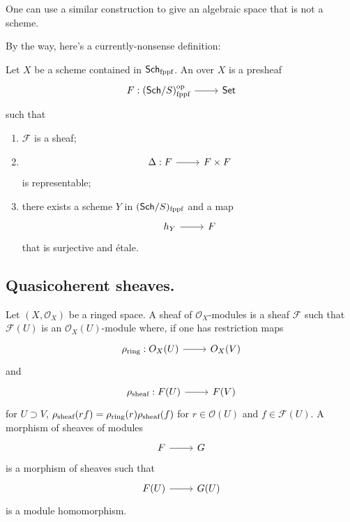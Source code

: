 \documentclass [11 pt, oneside] {article}
\begin{document}
\begin{remark}
	One can use a similar construction to give an algebraic space that is not a scheme.
	
	By the way, here's a currently-nonsense definition:

	Let $X$ be a scheme contained in $\textsf{Sch}\textsubscript{fppf}$. An  over $X$ is a presheaf
	\[
\begin{tikzcd}
\mathscr{F}: (\catn{Sch}/S)_{\textrm{fppf}}^{\textrm{op}}\ar[r]& \catn{Set}
\end{tikzcd}
\] 
	such that
	\begin{enumerate}
		\item $\mathscr{F}$ is a sheaf;
		\item
		\[
\begin{tikzcd}
\Delta: \mathscr{F}\ar[r]& \mathscr{F}\times\mathscr{F}
\end{tikzcd}
\] 
 is representable;
		\item there exists a scheme $Y$ in $(\textsf{Sch}/S)\textsubscript{fppf}$ and a map 
		\[
\begin{tikzcd}
h_Y\ar[r]& \mathscr{F}
\end{tikzcd}
\] 
 that is surjective and \'etale. 
	\end{enumerate}
\end{remark}

\subsection{Quasicoherent sheaves.}

Let $(X,\mathscr{O}_X)$ be a ringed space. A sheaf of $\mathscr{O}_X$-modules is a sheaf $\mathscr{F}$ such that $\mathscr{F}(U)$ is an $\mathscr{O}_X(U)$-module where, if one has restriction maps 
\[
\begin{tikzcd}
\rho\textsubscript{ring} : \mathscr{O}_X(U) \ar[r]& \mathscr{O}_X(V)
\end{tikzcd}
\] 
 and 
 \[
\begin{tikzcd}
\rho\textsubscript{sheaf} : \mathscr{F}(U)\ar[r]& \mathscr{F}(V)
\end{tikzcd}
\] 
for $U\supset V$, $\rho\textsubscript{sheaf}(rf)=\rho\textsubscript{ring} (r) \rho\textsubscript{sheaf}(f)$ for $r\in \mathscr{O}(U)$ and $f\in \mathscr{F}(U)$. A morphism of sheaves of modules 
\[
\begin{tikzcd}
\mathscr{F}\ar[r]& \mathscr{G}
\end{tikzcd}
\] 
is a morphism of sheaves such that 
\[
\begin{tikzcd}
\mathscr{F}(U) \ar[r]& \mathscr{G}(U)
\end{tikzcd}
\] 
is a module homomorphism.
\end{document}

